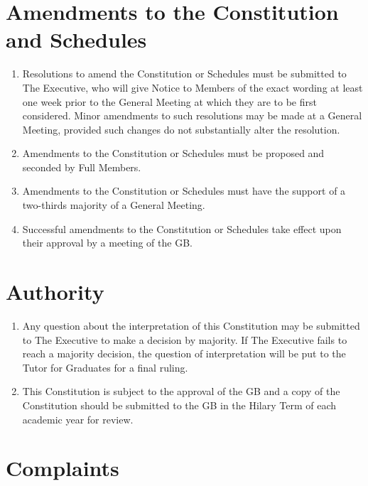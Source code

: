 \documentclass[11pt, a4paper]{article}
\begin{document}
\section{Amendments to the Constitution and Schedules}
\label{sec:amendment}

\begin{enumerate}
	\item Resolutions to amend the Constitution or Schedules must be submitted to The Executive, who will give Notice to Members of the exact wording at least one week prior to the General Meeting at which they are to be first considered. Minor amendments to such resolutions may be made at a General Meeting, provided such changes do not substantially alter the resolution.
    \item Amendments to the Constitution or Schedules must be proposed and seconded by Full Members.
    \item Amendments to the Constitution or Schedules must have the support of a two-thirds majority of a General Meeting.
    \item Successful amendments to the Constitution or Schedules take effect upon their approval by a meeting of the GB.
\end{enumerate}





\section{Authority}
\label{sec:authority}

\begin{enumerate}
	\item Any question about the interpretation of this Constitution may be submitted to The Executive to make a decision by majority. If The Executive fails to reach a majority decision, the question of interpretation will be put to the Tutor for Graduates for a final ruling.
    \item This Constitution is subject to the approval of the GB and a copy of the Constitution should be submitted to the GB in the Hilary Term of each academic year for review.
\end{enumerate}





\section{Complaints}
\label{sec:complaints}
\end{document}
